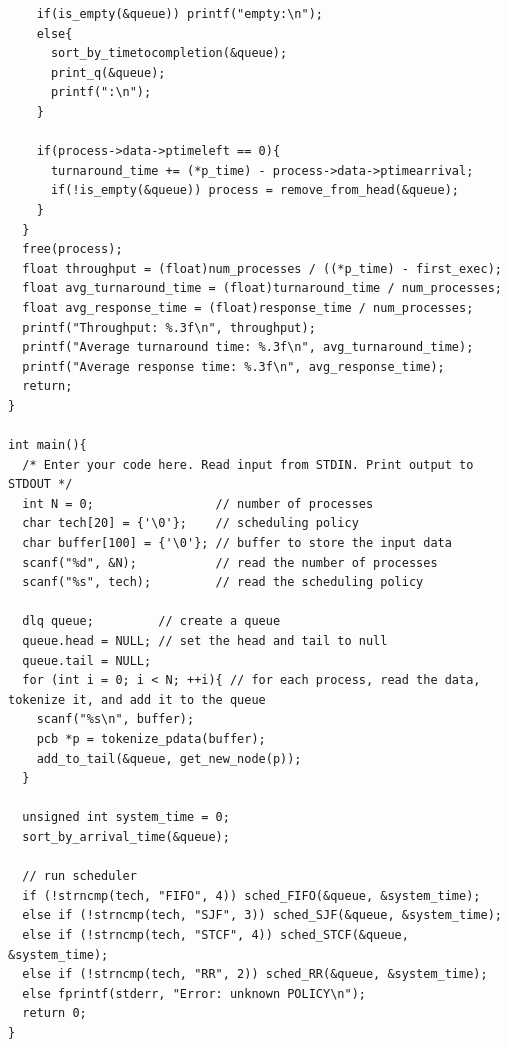 \documentclass{article}
\theoremstyle{mytheoremstyle}
\theoremstyle{mytheoremstyle}
\theoremstyle{myproblemstyle}
\begin{document}
\begin{lstlisting}
    if(is_empty(&queue)) printf("empty:\n");
    else{
      sort_by_timetocompletion(&queue);
      print_q(&queue);
      printf(":\n");
    }

    if(process->data->ptimeleft == 0){
      turnaround_time += (*p_time) - process->data->ptimearrival;
      if(!is_empty(&queue)) process = remove_from_head(&queue);
    }
  }
  free(process);
  float throughput = (float)num_processes / ((*p_time) - first_exec);
  float avg_turnaround_time = (float)turnaround_time / num_processes;
  float avg_response_time = (float)response_time / num_processes;
  printf("Throughput: %.3f\n", throughput);
  printf("Average turnaround time: %.3f\n", avg_turnaround_time);
  printf("Average response time: %.3f\n", avg_response_time);
  return;
}

int main(){
  /* Enter your code here. Read input from STDIN. Print output to STDOUT */
  int N = 0;                 // number of processes
  char tech[20] = {'\0'};    // scheduling policy
  char buffer[100] = {'\0'}; // buffer to store the input data
  scanf("%d", &N);           // read the number of processes
  scanf("%s", tech);         // read the scheduling policy

  dlq queue;         // create a queue
  queue.head = NULL; // set the head and tail to null
  queue.tail = NULL;
  for (int i = 0; i < N; ++i){ // for each process, read the data, tokenize it, and add it to the queue
    scanf("%s\n", buffer);
    pcb *p = tokenize_pdata(buffer);
    add_to_tail(&queue, get_new_node(p));
  }

  unsigned int system_time = 0;
  sort_by_arrival_time(&queue);

  // run scheduler
  if (!strncmp(tech, "FIFO", 4)) sched_FIFO(&queue, &system_time);
  else if (!strncmp(tech, "SJF", 3)) sched_SJF(&queue, &system_time);
  else if (!strncmp(tech, "STCF", 4)) sched_STCF(&queue, &system_time);
  else if (!strncmp(tech, "RR", 2)) sched_RR(&queue, &system_time);
  else fprintf(stderr, "Error: unknown POLICY\n");
  return 0;
}
\end{lstlisting}
\end{document}
